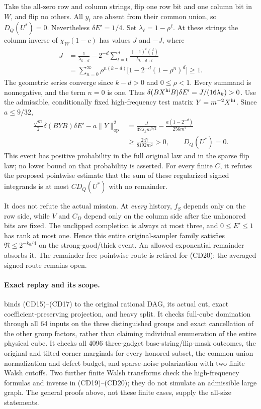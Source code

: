 \documentclass[11pt]{article}
\newcommand{\op}{\mathrm{op}}
\begin{document}
Take the all-zero row and column strings, flip one row bit and
one column bit in $W$, and flip no others. All $y_i$ are absent
from their common union, so $D_Q(U^*)=0$. Nevertheless
$\delta E'=1/4$. Set $\lambda_\ell=1-\rho^\ell$. At these strings
the column inverse of $\chi_W(1-c)$ has values $J$ and $-J$, where
\[
 \begin{split}
 J&=\frac1{\lambda_{k-d}}
   -2^{-d}\sum_{t=0}^d
        \frac{(-1)^t\binom dt}{\lambda_{k-d+t}}\\
  &=\sum_{n=0}^{\infty}\rho^{n(k-d)}
                    \bigl[1-2^{-d}(1-\rho^n)^d\bigr]\ge1 .
 \end{split}
\]
The geometric series converge since $k-d>0$ and $0\le\rho<1$.
Every summand is nonnegative, and the term $n=0$ is one.
Thus
$\delta(BX^{\rm hi}B)\delta E'=J/(16\lambda_k)>0$.
Use the admissible, conditionally fixed high-frequency test matrix
$Y=m^{-2}X^{\rm hi}$. Since $a\le9/32$,
\[
 \begin{split}
 \frac{\sqrt m}{2}\delta(BYB)\delta E'-a\|Y\|_{\op}^2
 &=\frac{J}{32\lambda_km^{3/2}}
             -\frac{a(1-2^{-d})}{256m^2}\\
 &\ge\frac{247}{8192m^2}>0,\qquad D_Q(U^*)=0.            \tag{CD20}
 \end{split}
\]
This event has positive probability in the full original law
and in the sparse flip law; no lower bound on that probability
is asserted.
For every finite $C$, it refutes the proposed pointwise estimate
that the sum of these regularized signed integrands is at most
$C D_Q(U^*)$ with no remainder.

It does not refute the actual mission. At \emph{every} history,
$f_S$ depends only on the row side, while $V$ and $C_D$ depend
only on the column side after the unhonored bits are fixed.
The unclipped completion is always at most three, and
$0\le E'\le1$ has rank at most one. Hence this entire original-sampler
family satisfies
$\mathfrak N\le2^{-k_0/4}$ on the strong-good/thick event.
An allowed exponential remainder absorbs it.
The remainder-free pointwise route is retired for (CD20);
the averaged signed route remains open.

\paragraph{Exact replay and its scope.}
 binds (CD15)--(CD17) to the original
rational DAG, its actual cut, exact coefficient-preserving projection,
and heavy split. It checks full-cube domination through all 64 inputs
on the three distinguished groups and exact cancellation of the
other group factors, rather than claiming individual enumeration of
the entire physical cube.
It checks all 4096 three-gadget base-string/flip-mask outcomes,
the original and tilted corner marginals for every honored subset,
the common union normalization and defect budget, and sparse-noise
polarization with two finite Walsh cutoffs. Two further finite
Walsh transforms check the high-frequency formulas and inverse
in (CD19)--(CD20); they do not simulate an admissible large graph.
The general proofs above, not these finite cases, supply the
all-size statements.
\end{document}
